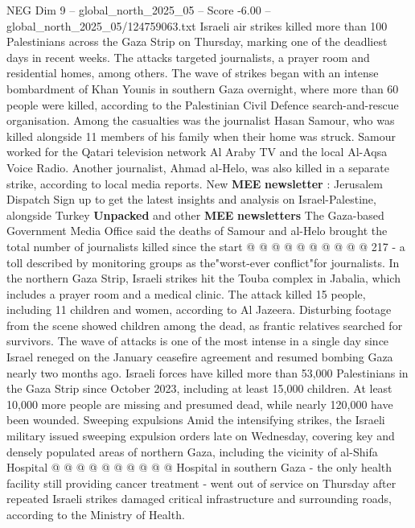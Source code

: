 \begin{textsample}{NEG Dim 9 – global\_north\_2025\_05 – Score -6.00 – global\_north\_2025\_05/124759063.txt}  \label{ex:f9_neg_087}
Israeli air strikes killed more than 100 Palestinians across the Gaza Strip on Thursday, marking one of the deadliest days in recent weeks.
The attacks targeted journalists, a prayer room and residential homes, among others.
The wave of strikes began with an intense bombardment of Khan Younis in southern Gaza overnight, where more than 60 people were killed, according to the Palestinian Civil Defence search-and-rescue organisation.
Among the casualties was the journalist Hasan Samour, who was killed alongside 11 members of his family when their home was struck.
Samour worked for the Qatari television network Al Araby TV and the local Al-Aqsa Voice Radio.
Another journalist, Ahmad al-Helo, was also killed in a separate strike, according to local media reports.
New \textbf{MEE} \textbf{newsletter} : Jerusalem Dispatch Sign up to get the latest insights and analysis on Israel-Palestine, alongside Turkey \textbf{Unpacked} and other \textbf{MEE} \textbf{newsletters} The Gaza-based Government Media Office said the deaths of Samour and al-Helo brought the total number of journalists killed since the start @ @ @ @ @ @ @ @ @ @ 217 - a toll described by monitoring groups as the"worst-ever conflict"for journalists.
In the northern Gaza Strip, Israeli strikes hit the Touba complex in Jabalia, which includes a prayer room and a medical clinic.
The attack killed 15 people, including 11 children and women, according to Al Jazeera.
Disturbing footage from the scene showed children among the dead, as frantic relatives searched for survivors.
The wave of attacks is one of the most intense in a single day since Israel reneged on the January ceasefire agreement and resumed bombing Gaza nearly two months ago.
Israeli forces have killed more than 53,000 Palestinians in the Gaza Strip since October 2023, including at least 15,000 children.
At least 10,000 more people are missing and presumed dead, while nearly 120,000 have been wounded.
Sweeping expulsions Amid the intensifying strikes, the Israeli military issued sweeping expulsion orders late on Wednesday, covering key and densely populated areas of northern Gaza, including the vicinity of al-Shifa Hospital @ @ @ @ @ @ @ @ @ @ Hospital in southern Gaza - the only health facility still providing cancer treatment - went out of service on Thursday after repeated Israeli strikes damaged critical infrastructure and surrounding roads, according to the Ministry of Health.

\end{textsample}

